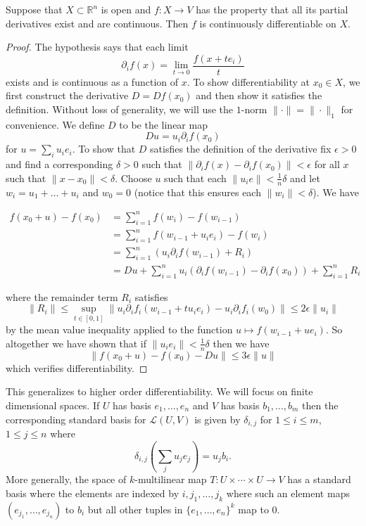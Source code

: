 \documentclass[twoside, a4paper, 10pt]{amsart}
\begin{document}
\begin{prop} Suppose that $X \subset \mathbb{R}^n$ is open and $f:X \to V$ has the property that all its partial derivatives exist and are continuous. Then $f$ is continuously differentiable on $X$.

\end{prop}

\begin{proof} The hypothesis says that each limit $$\partial_if(x) = \lim_{t \to 0} \frac{f(x+te_i)}{t}$$ exists and is continuous as a function of $x$. To show differentiability at $x_0 \in X$, we first construct the derivative $D= Df (x_0) $ and then show it satisfies the definition. Without loss of generality, we will use the $1$-norm $\| \cdot \| = \| \cdot \|_1$ for convenience. We define $D$ to be the linear map $$Du = u_i \partial_i f (x_0)$$ for $u = \sum_i u_i e_i$. To show that $D$ satisfies the definition of the derivative fix $\epsilon >0$ and find a corresponding $\delta >0$ such that $\| \partial_i f(x) - \partial_if (x_0) \| < \epsilon$ for all $x$ such that $\|x - x_0\| < \delta$. Choose $u$ such that each $\|u_ie\| < \frac{1}{n} \delta$ and let $w_i = u_1 + \ldots + u_i$ and $w_0 = 0$ (notice that this ensures each $\|w_i \| < \delta$). We have 

\begin{align*} f(x_0 + u) - f(x_0) &= \sum_{i=1}^n f(w_i) - f(w_{i-1}) \\ &= \sum_{i=1}^n f(w_{i-1} + u_i e_i) - f(w_{i}) \\ &= \sum_{i=1}^n (u_i \partial_i f(w_{i-1}) + R_i) \\ &= Du + \sum_{i=1}^n u_i \left(\partial_i f(w_{i-1}) - \partial_i f(x_0) \right) + \sum_{i=1}^n R_i \end{align*}

where the remainder term $R_i$ satisfies $$\|R_i \| \leq \sup_{t \in [0,1]} \| u_i \partial_i f_i (w_{i-1} + tu_ie_i) - u_i \partial_i f_i (w_0)\| \leq 2 \epsilon \|u_i\|$$ by the mean value inequality applied to the function $u \mapsto f(w_{i-1} + ue_i)$. So altogether we have shown that if $\|u_i e_i\| < \frac{1}{n}\delta$ then we have $$\|f(x_0 + u) -f(x_0) - Du\| \leq 3\epsilon \|u\|$$ which verifies differentiability. \end{proof}

This generalizes to higher order differentiability. We will focus on finite dimensional spaces. If $U$ has basis $e_1, \ldots, e_n$ and $V$ has basis $b_1, \ldots, b_m$ then the corresponding standard basis for $\mathcal{L}(U,V)$ is given by $\delta_{i,j}$ for $1 \leq i \leq m$, $1 \leq j \leq n$ where $$\delta_{i,j}\left( \sum_{j} u_j e_j \right) = u_j b_i.$$ More generally, the space of $k$-multilinear map $T:U \times \cdots \times U \to V$ has a standard basis where the elements are indexed by $i, j_1, \ldots, j_k$ where such an element maps  $(e_{j_1}, \ldots, e_{j_n})$ to $b_i$ but all other tuples in $\{e_1, \ldots, e_n\}^k$ map to $0$.
\end{document}
